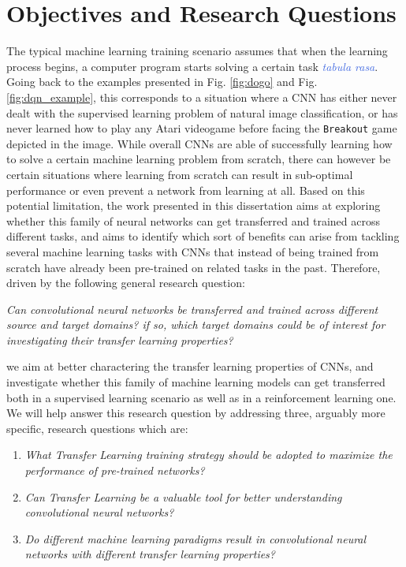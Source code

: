 \section{Objectives and Research Questions}

The typical machine learning training scenario assumes that when the learning process begins, a computer program starts solving a certain task \textcolor{RoyalBlue}{\textit{tabula rasa}}. Going back to the examples presented in Fig. \ref{fig:dogo} and Fig. \ref{fig:dqn_example}, this corresponds to a situation where a CNN has either never dealt with the supervised learning problem of natural image classification, or has never learned how to play any Atari videogame before facing the \texttt{Breakout} game depicted in the image. While overall CNNs are able of successfully learning how to solve a certain machine learning problem from scratch, there can however be certain situations
where learning from scratch can result in sub-optimal performance or even prevent a network from  learning at all. Based on this potential limitation, the work presented in this dissertation aims at exploring whether this family of neural networks can get transferred and trained across different tasks, and aims to identify which sort of benefits can arise from tackling several machine learning tasks with CNNs that instead of being trained from scratch have already been pre-trained on related tasks in the past. Therefore, driven by the following general research question:
\begin{center}
	\textit{Can convolutional neural networks be transferred and trained across different source and target domains? if so, which target domains could be of interest for investigating their transfer learning properties?}	
\end{center}    
we aim at better charactering the transfer learning properties of CNNs, and investigate whether this family of machine learning models can get transferred both in a supervised learning scenario as well as in a reinforcement learning one. We will help answer this research question by addressing three, arguably more specific, research questions which are:
\begin{enumerate}
	\item \textit{What Transfer Learning training strategy should be adopted to maximize the performance of pre-trained networks?}

	\item \textit{Can Transfer Learning be a valuable tool for better understanding convolutional neural networks?}
	
	\item \textit{Do different machine learning paradigms result in convolutional neural networks with different transfer learning properties?}
\end{enumerate}


